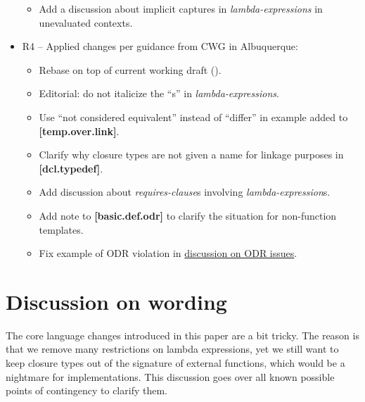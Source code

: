 \documentclass{wg21}
\begin{document}
\begin{itemize}
\begin{itemize}
      \item Add a discussion about implicit captures in \textit{lambda-expressions}
            in unevaluated contexts.
    \end{itemize}
  \item R4 -- Applied changes per guidance from CWG in Albuquerque:
    \begin{itemize}
      \item Rebase on top of current working draft (\cite{N4700}).
      \item Editorial: do not italicize the ``s'' in \textit{lambda-expressions}.
      \item Use ``not considered equivalent'' instead of ``differ'' in example
            added to \textbf{[temp.over.link]}.
      \item Clarify why closure types are not given a name for linkage purposes
            in \textbf{[dcl.typedef]}.
      \item Add discussion about \textit{requires-clause}s involving
            \textit{lambda-expression}s.
      \item Add note to \textbf{[basic.def.odr]} to clarify the situation for
            non-function templates.
      \item Fix example of ODR violation in \hyperref[discussion.nontype]{
            discussion on ODR issues}.
    \end{itemize}
\end{itemize}

\section{Discussion on wording}
The core language changes introduced in this paper are a bit tricky. The reason
is that we remove many restrictions on lambda expressions, yet we still want to
keep closure types out of the signature of external functions, which would be
a nightmare for implementations. This discussion goes over all known possible
points of contingency to clarify them.
\end{document}
